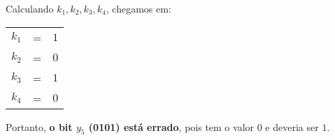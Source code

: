 \documentclass[12pt]{article}
\begin{document}
\begin{itemize}
					\newpage
					Calculando $k_1, k_2, k_3, k_4$, chegamos em:\\
					\begin{center}
						\begin{tabular}{ccl}
							$k_1$ & = & $1$\\
							$k_2$ & = & $0$\\
							$k_3$& = & $1$\\
							$k_4$ & = & $0$\\
						\end{tabular}
					\end{center}
					Portanto, \textbf{o bit $y_5$ (0101) está errado}, pois tem o valor $0$ e 
					deveria ser $1$.
	\end{itemize}
\end{document}
